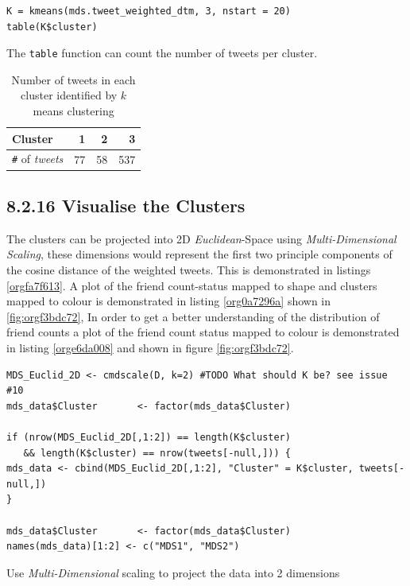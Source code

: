 \documentclass[11pt]{article}
\begin{document}
\begin{listing}[htbp]
\begin{verbatim}
K = kmeans(mds.tweet_weighted_dtm, 3, nstart = 20)
table(K$cluster)
\end{verbatim}
\caption{\label{org814c66c}The \texttt{table} function can count the number of tweets per cluster.}
\end{listing}

\begin{table}[htbp]
\caption{\label{tab:org8c72d1e}Number of tweets in each cluster identified by \(k\) means clustering}
\centering
\begin{tabular}{lrrr}
Cluster & 1 & 2 & 3\\
\hline
\texttt{\#} of \emph{tweets} & 77 & 58 & 537\\
\end{tabular}
\end{table}

\subsection{8.2.16 Visualise the Clusters}
\label{sec:org9e36c04}
The clusters can be projected into 2D \emph{Euclidean}-Space using \emph{Multi-Dimensional
Scaling}, these dimensions would represent the first two principle components of
the cosine distance of the weighted tweets. This is demonstrated in listings
\ref{orgfa7f613}. A plot of the friend count-status mapped to shape and clusters mapped to
colour is demonstrated in listing \ref{org0a7296a} shown in \ref{fig:orgf3bdc72}, In order to get a better
understanding of the distribution of friend counts a plot of the friend count
status mapped to colour is demonstrated in listing \ref{orge6da008} and shown in figure \ref{fig:orgf3bdc72}.


\begin{listing}[htbp]
\begin{verbatim}
MDS_Euclid_2D <- cmdscale(D, k=2) #TODO What should K be? see issue #10
mds_data$Cluster       <- factor(mds_data$Cluster)

if (nrow(MDS_Euclid_2D[,1:2]) == length(K$cluster)
   && length(K$cluster) == nrow(tweets[-null,])) {
mds_data <- cbind(MDS_Euclid_2D[,1:2], "Cluster" = K$cluster, tweets[-null,])
}

mds_data$Cluster       <- factor(mds_data$Cluster)
names(mds_data)[1:2] <- c("MDS1", "MDS2")
\end{verbatim}
\caption{\label{orgfa7f613}Use \emph{Multi-Dimensional} scaling to project the data into 2 dimensions}
\end{listing}
\end{document}
